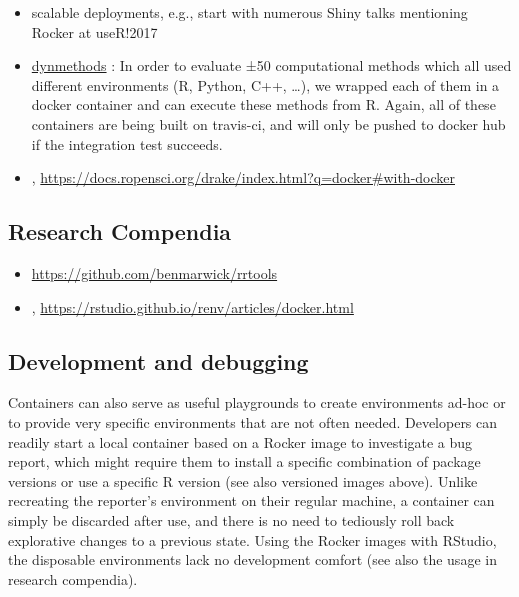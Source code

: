 \begin{itemize}
{  jobs with Docker Swarm}
\item
  scalable deployments, e.g., start with numerous Shiny talks mentioning
  Rocker at useR!2017
\item
  \href{https://github.com/dynverse/dynmethods}{dynmethods}
  \citep{rcannood}: In order to evaluate ±50 computational methods which
  all used different environments (R, Python, C++, \ldots{}), we wrapped
  each of them in a docker container and can execute these methods from
  R. Again, all of these containers are being built on travis-ci, and
  will only be pushed to docker hub if the integration test succeeds.
\item
  ,
  \url{https://docs.ropensci.org/drake/index.html?q=docker\#with-docker}
\end{itemize}

\hypertarget{research-compendia-benmarwick}{%
\subsection{\texorpdfstring{Research Compendia
\citep{benmarwick}}{Research Compendia {[}@benmarwick{]}}}\label{research-compendia-benmarwick}}

\begin{itemize}
\tightlist
\item
  \url{https://github.com/benmarwick/rrtools}
\item
  , \url{https://rstudio.github.io/renv/articles/docker.html}
\end{itemize}

\hypertarget{development-and-debugging}{%
\subsection{Development and debugging}\label{development-and-debugging}}

\label{development}

Containers can also serve as useful playgrounds to create environments
ad-hoc or to provide very specific environments that are not often
needed. Developers can readily start a local container based on a Rocker
image to investigate a bug report, which might require them to install a
specific combination of package versions or use a specific R version
(see also versioned images above). Unlike recreating the reporter's
environment on their regular machine, a container can simply be
discarded after use, and there is no need to tediously roll back
explorative changes to a previous state. Using the Rocker images with
RStudio, the disposable environments lack no development comfort (see
also the usage in research compendia).


